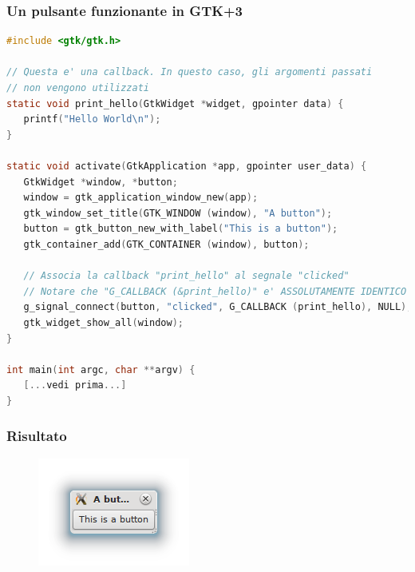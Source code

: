 \documentclass{beamer}
\begin{document}
\begin{frame}[fragile]
\frametitle{Un pulsante \textbf{funzionante} in GTK+3}
\begin{lstlisting}[language=C]
#include <gtk/gtk.h>

// Questa e' una callback. In questo caso, gli argomenti passati
// non vengono utilizzati
static void print_hello(GtkWidget *widget, gpointer data) {
   printf("Hello World\n");
}

static void activate(GtkApplication *app, gpointer user_data) {
   GtkWidget *window, *button;
   window = gtk_application_window_new(app);
   gtk_window_set_title(GTK_WINDOW (window), "A button");
   button = gtk_button_new_with_label("This is a button");
   gtk_container_add(GTK_CONTAINER (window), button);

   // Associa la callback "print_hello" al segnale "clicked"
   // Notare che "G_CALLBACK (&print_hello)" e' ASSOLUTAMENTE IDENTICO
   g_signal_connect(button, "clicked", G_CALLBACK (print_hello), NULL);
   gtk_widget_show_all(window);
}

int main(int argc, char **argv) {
   [...vedi prima...]
}
\end{lstlisting}
\end{frame}

\begin{frame}
\frametitle{Risultato}
\begin{figure}
 \includegraphics[width=0.6\columnwidth]{img/3}
\end{figure}
\end{frame}
\end{document}
